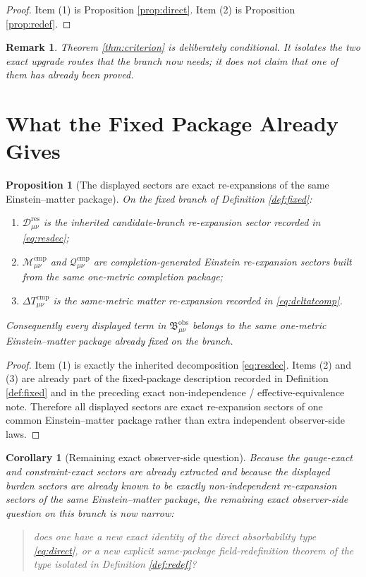 \documentclass[11pt]{article}
\newcommand{\ResidualDec}{\mathcal D_{\mu\nu}^{\mathrm{res}}}
\newcommand{\CompMix}{\mathcal M_{\mu\nu}^{\mathrm{cmp}}}
\newcommand{\CompQuad}{\mathcal Q_{\mu\nu}^{\mathrm{cmp}}}
\newcommand{\DeltaTComp}{\Delta T_{\mu\nu}^{\mathrm{cmp}}}
\newcommand{\ObsBurden}{\mathfrak B_{\mu\nu}^{\mathrm{obs}}}
\newtheorem{proposition}{Proposition}
\newtheorem{remark}{Remark}
\newtheorem{corollary}{Corollary}
\begin{document}
\begin{proof}
Item (1) is Proposition \ref{prop:direct}. Item (2) is Proposition \ref{prop:redef}.
\end{proof}

\begin{remark}
Theorem \ref{thm:criterion} is deliberately conditional. It isolates the two exact upgrade routes that the branch now needs; it does not claim that one of them has already been proved.
\end{remark}

\section{What the Fixed Package Already Gives}

\begin{proposition}[The displayed sectors are exact re-expansions of the same Einstein--matter package]
\label{prop:reexp}
On the fixed branch of Definition \ref{def:fixed}:
\begin{enumerate}
    \item \(\ResidualDec\) is the inherited candidate-branch re-expansion sector recorded in \eqref{eq:resdec};
    \item \(\CompMix\) and \(\CompQuad\) are completion-generated Einstein re-expansion sectors built from the same one-metric completion package;
    \item \(\DeltaTComp\) is the same-metric matter re-expansion recorded in \eqref{eq:deltatcomp}.
\end{enumerate}
Consequently every displayed term in \(\ObsBurden\) belongs to the same one-metric Einstein--matter package already fixed on the branch.
\end{proposition}

\begin{proof}
Item (1) is exactly the inherited decomposition \eqref{eq:resdec}. Items (2) and (3) are already part of the fixed-package description recorded in Definition \ref{def:fixed} and in the preceding exact non-independence / effective-equivalence note. Therefore all displayed sectors are exact re-expansion sectors of one common Einstein--matter package rather than extra independent observer-side laws.
\end{proof}

\begin{corollary}[Remaining exact observer-side question]
\label{cor:question}
Because the gauge-exact and constraint-exact sectors are already extracted and because the displayed burden sectors are already known to be exactly non-independent re-expansion sectors of the same Einstein--matter package, the remaining exact observer-side question on this branch is now narrow:
\begin{quote}
does one have a new exact identity of the direct absorbability type \eqref{eq:direct}, or a new explicit same-package field-redefinition theorem of the type isolated in Definition \ref{def:redef}?
\end{quote}
\end{corollary}
\end{document}
